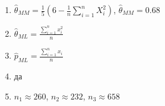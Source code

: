 \documentclass[12pt]{article}
\begin{document}
\begin{enumerate}
\item $\hat{\theta}_{MM} = \frac{1}{5}\left(6 - \frac{1}{n}\sum_{i=1}^n X_i^2 \right)$, $\hat{\theta}_{MM} = 0.68$
\item $\hat{\theta}_{ML} = \frac{\sum_{i=1}^n x_i^2}{n}$
\item $\hat{p}_{ML} = \frac{\sum_{i=1}^n x_i}{n}$
\item да
\item $n_1 \approx 260$, $n_2 \approx 232$, $n_3 \approx 658$

\end{enumerate}
\end{document}
